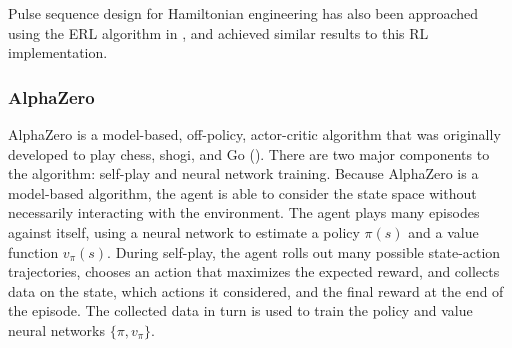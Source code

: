 Pulse sequence design for Hamiltonian engineering has also been approached using the ERL algorithm in \cite{peng2021deep}, and achieved similar results to this RL implementation.

\subsubsection{AlphaZero}

AlphaZero is a model-based, off-policy, actor-critic algorithm that was originally developed to play chess, shogi, and Go (\cite{Silver1140}). There are two major components to the algorithm: self-play and neural network training. Because AlphaZero is a model-based algorithm, the agent is able to consider the state space without necessarily interacting with the environment. The agent plays many episodes against itself, using a neural network to estimate a policy $\pi(s)$ and a value function $v_\pi(s)$. During self-play, the agent rolls out many possible state-action trajectories, chooses an action that maximizes the expected reward, and collects data on the state, which actions it considered, and the final reward at the end of the episode. The collected data in turn is used to train the policy and value neural networks $\{ \pi, v_\pi \}$.
